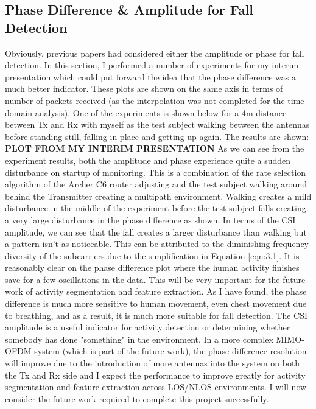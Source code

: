 \subsection{Phase Difference \& Amplitude for Fall Detection}
Obviously, previous papers had considered either the amplitude or phase for fall detection. In this section, I performed a number of experiments for my interim presentation which could put forward the idea that the phase difference was a much better indicator. These plots are shown on the same axis in terms of number of packets received (as the interpolation was not completed for the time domain analysis). One of the experiments is shown below for a 4m distance between Tx and Rx with myself as the test subject walking between the antennas before standing still, falling in place and getting up again. The results are shown:
\textbf{PLOT FROM MY INTERIM PRESENTATION}
As we can see from the experiment results, both the amplitude and phase experience quite a sudden disturbance on startup of monitoring. This is a combination of the rate selection algorithm of the Archer C6 router adjusting and the test subject walking around behind the Transmitter creating a multipath environment. Walking creates a mild disturbance in the middle of the experiment before the test subject falls creating a very large disturbance in the phase difference as shown. In terms of the CSI amplitude, we can see that the fall creates a larger disturbance than walking but a pattern isn't as noticeable. This can be attributed to the diminishing frequency diversity of the subcarriers due to the simplification in Equation \ref{eqn:3.1}. It is reasonably clear on the phase difference plot where the human activity finishes save for a few oscillations in the data. This will be very important for the future work of activity segmentation and feature extraction. As I have found, the phase difference is much more sensitive to human movement, even chest movement due to breathing, and as a result, it is much more suitable for fall detection. The CSI amplitude is a useful indicator for activity detection or determining whether somebody has done "something" in the environment. In a more complex MIMO-OFDM system (which is part of the future work), the phase difference resolution will improve due to the introduction of more antennas into the system on both the Tx and Rx side and I expect the performance to improve greatly for activity segmentation and feature extraction across LOS/NLOS environments. I will now consider the future work required to complete this project successfully. 